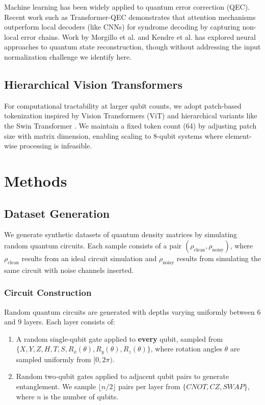 \documentclass[11pt]{article}
\begin{document}
Machine learning has been widely applied to quantum error correction (QEC). Recent work such as Transformer-QEC \autocite{wang2023transformerqecquantumerrorcorrection} demonstrates that attention mechanisms outperform local decoders (like CNNs) for syndrome decoding by capturing non-local error chains. Work by Morgillo et al. \autocite{Morgillo_2024} and Kendre et al. \autocite{kendre2025machinelearningquantumnoise} has explored neural approaches to quantum state reconstruction, though without addressing the input normalization challenge we identify here.

\subsection{Hierarchical Vision Transformers}
\label{sec:orgfa51493}

For computational tractability at larger qubit counts, we adopt patch-based tokenization inspired by Vision Transformers (ViT) \autocite{dosovitskiy2020image} and hierarchical variants like the Swin Transformer \autocite{liu2021swin}. We maintain a fixed token count (64) by adjusting patch size with matrix dimension, enabling scaling to 8-qubit systems where element-wise processing is infeasible.

\section{Methods}
\label{sec:org6df6761}

\subsection{Dataset Generation}
\label{sec:org78c2348}

We generate synthetic datasets of quantum density matrices by simulating random quantum circuits. Each sample consists of a pair \((\rho_{\text{clean}}, \rho_{\text{noisy}})\), where \(\rho_{\text{clean}}\) results from an ideal circuit simulation and \(\rho_{\text{noisy}}\) results from simulating the same circuit with noise channels inserted.

\subsubsection{Circuit Construction}
\label{sec:org8587e37}

Random quantum circuits are generated with depths varying uniformly between 6 and 9 layers. Each layer consists of:
\begin{enumerate}
\item A random single-qubit gate applied to \textbf{every} qubit, sampled from \(\{X, Y, Z, H, T, S, R_x(\theta), R_y(\theta), R_z(\theta)\}\), where rotation angles \(\theta\) are sampled uniformly from \([0, 2\pi)\).
\item Random two-qubit gates applied to adjacent qubit pairs to generate entanglement. We sample \(\lfloor n/2 \rfloor\) pairs per layer from \(\{CNOT, CZ, SWAP\}\), where \(n\) is the number of qubits.
\end{enumerate}
\end{document}
